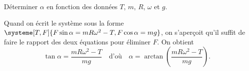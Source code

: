 

\begin{enonce}
Déterminer $\alpha$ en fonction des données $T$, $m$, $R$, $\omega$ et $g$.
\end{enonce}


\begin{corrige}
	Quand on écrit le système sous la forme $\systeme[T,F]{F\sin\alpha=mR\omega^2-T,F\cos\alpha=mg}$, on s'aperçoit qu'il suffit de faire le rapport des deux équations pour éliminer $F$. On obtient 
	\[
		\tan\alpha=\frac{mR\omega^2-T}{mg}
		\quad\text{d'où}\quad
		\alpha=\arctan{\left(\frac{mR\omega^2-T}{mg}\right)}.
	\]
\end{corrige}


\finEntrainement



